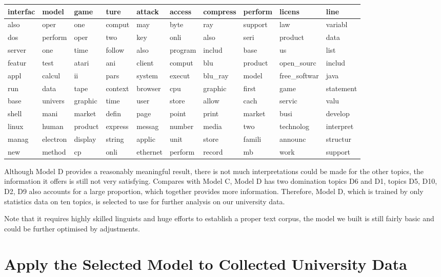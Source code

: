 \documentclass[
  letterpaper,
]{report}
\begin{document}
\begin{table}
\begin{tabular}{l|l|l|l|l|l|l|l|l|l}
\hline
interfac & model & game & ture & attack & access & compress & perform & licens & line\\
\hline
also & oper & one & comput & may & byte & ray & support & law & variabl\\
\hline
dos & perform & oper & two & key & onli & also & seri & product & data\\
\hline
server & one & time & follow & also & program & includ & base & us & list\\
\hline
featur & test & atari & ani & client & comput & blu & product & open\_sourc & includ\\
\hline
appl & calcul & ii & pars & system & execut & blu\_ray & model & free\_softwar & java\\
\hline
run & data & tape & context & browser & cpu & graphic & first & game & statement\\
\hline
base & univers & graphic & time & user & store & allow & cach & servic & valu\\
\hline
shell & mani & market & defin & page & point & print & market & busi & develop\\
\hline
linux & human & product & express & messag & number & media & two & technolog & interpret\\
\hline
manag & electron & display & string & applic & unit & store & famili & announc & structur\\
\hline
new & method & cp & onli & ethernet & perform & record & mb & work & support\\
\hline
\end{tabular}
\end{table}

Although Model D provides a reasonably meaningful result, there is not
much interpretations could be made for the other topics, the information
it offers is still not very satisfying. Compares with Model C, Model D
has two domination topics D6 and D1, topics D5, D10, D2, D9 also
accounts for a large proportion, which together provides more
information. Therefore, Model D, which is trained by only statistics
data on ten topics, is selected to use for further analysis on our
university data.

Note that it requires highly skilled linguists and huge efforts to
establish a proper text corpus, the model we built is still fairly basic
and could be further optimised by adjustments.

\hypertarget{sec-unitopic}{%
\chapter{Apply the Selected Model to Collected University
Data}\label{sec-unitopic}}
\end{document}

